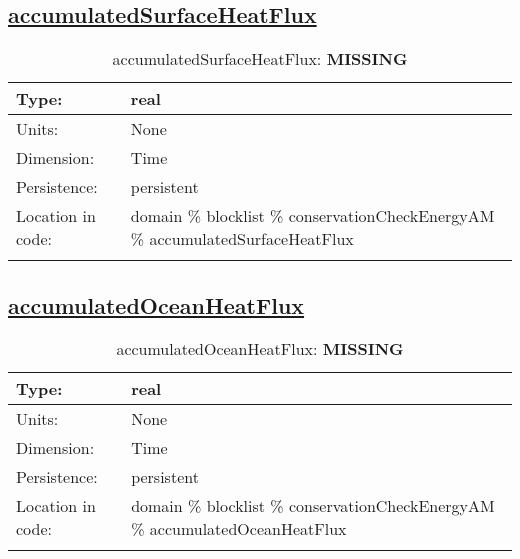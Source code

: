 \subsection[accumulatedSurfaceHeatFlux]{\hyperref[sec:var_tab_conservationCheckEnergyAM]{accumulatedSurfaceHeatFlux}}
\label{subsec:var_sec_conservationCheckEnergyAM_accumulatedSurfaceHeatFlux}
\begin{center}
\begin{longtable}{| p{2.0in} | p{4.0in} |}
        \hline 
        Type: & real \\
        \hline 
        Units: & \si{None} \\
        \hline 
        Dimension: & Time \\
        \hline 
        Persistence: & persistent \\
        \hline 
         Location in code: & domain \% blocklist \% conservationCheckEnergyAM \% accumulatedSurfaceHeatFlux \\
         \hline 
    \caption{accumulatedSurfaceHeatFlux: {\bf \color{red} MISSING}}
\end{longtable}
\end{center}
\subsection[accumulatedOceanHeatFlux]{\hyperref[sec:var_tab_conservationCheckEnergyAM]{accumulatedOceanHeatFlux}}
\label{subsec:var_sec_conservationCheckEnergyAM_accumulatedOceanHeatFlux}
\begin{center}
\begin{longtable}{| p{2.0in} | p{4.0in} |}
        \hline 
        Type: & real \\
        \hline 
        Units: & \si{None} \\
        \hline 
        Dimension: & Time \\
        \hline 
        Persistence: & persistent \\
        \hline 
         Location in code: & domain \% blocklist \% conservationCheckEnergyAM \% accumulatedOceanHeatFlux \\
         \hline 
    \caption{accumulatedOceanHeatFlux: {\bf \color{red} MISSING}}
\end{longtable}
\end{center}
